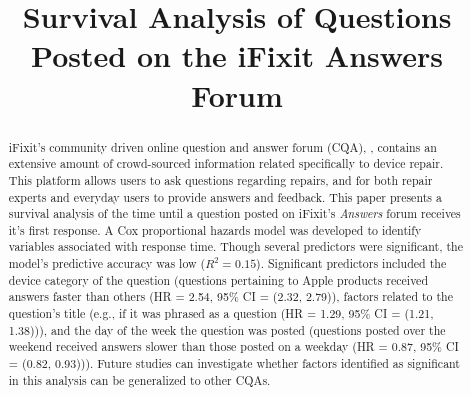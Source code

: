 \documentclass[]{interact}\usepackage[]{graphicx}\usepackage[]{color}
\begin{document}
\makeatletter
\DeclareRobustCommand\bfseries{%
  \not@math@alphabet\bfseries\mathbf
  \fontseries\bfdefault\selectfont
  \boldmath %
}
\makeatother




\title{Survival Analysis of Questions Posted on the iFixit Answers Forum}

\author{

\maketitle




\begin{abstract} 
iFixit's community driven online question and answer forum (CQA), , contains an extensive amount of crowd-sourced information related specifically to device repair. This platform allows users to ask questions regarding repairs, and for both repair experts and everyday users to provide answers and feedback. This paper presents a survival analysis of the time until a question posted on iFixit's \textit{Answers} forum receives it's first response. A Cox proportional hazards model was developed to identify variables associated with response time. Though several predictors were significant, the model's predictive accuracy was low ($R^2 = 0.15$). Significant predictors included the device category of the question (questions pertaining to Apple products received answers faster than others (HR = 2.54, 95\% CI = (2.32, 2.79)), factors related to the question's title (e.g., if it was phrased as a question (HR = 1.29, 95\% CI = (1.21, 1.38))), and the day of the week the question was posted (questions posted over the weekend received answers slower than those posted on a weekday (HR = 0.87, 95\% CI = (0.82, 0.93))). Future studies can investigate whether factors identified as significant in this analysis can be generalized to other CQAs.
\end{abstract}

}
\end{document}
